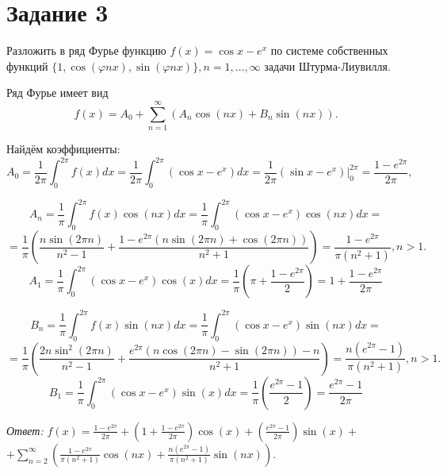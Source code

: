 \section*{Задание 3}
    Разложить в ряд Фурье функцию \( f(x) = \cos x - e^x \) по системе собственных функций \( \{ 1, \cos(\varphi n x), \sin(\varphi n x) \}, n = 1,\dots,\infty \) задачи Штурма-Лиувилля.

    Ряд Фурье имеет вид 
    \[
        f(x) = A_0 + \sum_{n=1}^{\infty} \left( A_n \cos(nx) + B_n \sin(nx) \right).
    \]

    Найдём коэффициенты:
    \[
        A_0 = \frac{1}{2\pi} \int_{0}^{2\pi} f(x) dx = \frac{1}{2\pi} \int_{0}^{2\pi} \left( \cos x - e^x \right) dx = \frac{1}{2\pi} \left( \sin x - e^x \right) \big|_0^{2\pi} = \frac{1 - e^{2\pi}}{2\pi},
    \]

    \[
        A_n = \frac{1}{\pi} \int_{0}^{2\pi} f(x) \cos(nx) dx = \frac{1}{\pi} \int_{0}^{2\pi} \left( \cos x - e^x \right) \cos(nx) dx =
    \]
    \[
        = \frac{1}{\pi} \left( \frac{n \sin(2\pi n)}{n^2 - 1} + \frac{1 - e^{2\pi} \left( n \sin(2\pi n) + \cos(2\pi n)\right)}{n^2+1}\right) = \frac{1 - e^{2\pi}}{\pi (n^2 + 1)}, n > 1.
    \]
    \[
        A_1 = \frac{1}{\pi} \int_{0}^{2\pi} \left( \cos x - e^x \right) \cos(x) dx = \frac{1}{\pi} \left( \pi + \frac{1 - e^{2\pi}}{2} \right)= 1 + \frac{1 - e^{2\pi}}{2\pi}
    \]

    \[
        B_n = \frac{1}{\pi} \int_{0}^{2\pi} f(x) \sin(nx) dx = \frac{1}{\pi} \int_{0}^{2\pi} \left( \cos x - e^x \right) \sin(nx) dx =
    \]
    \[
        = \frac{1}{\pi} \left( \frac{2n \sin^2(2\pi n)}{n^2 - 1} + \frac{e^{2\pi} \left(n \cos(2\pi n) - \sin(2\pi n)\right) - n}{n^2+1}\right) = \frac{n\left(e^{2\pi} - 1\right)}{\pi (n^2 + 1)}, n > 1.
    \]
    \[
        B_1 = \frac{1}{\pi} \int_{0}^{2\pi} \left( \cos x - e^x \right) \sin(x) dx = \frac{1}{\pi} \left( \frac{e^{2\pi} - 1}{2} \right) = \frac{e^{2\pi} - 1}{2\pi}
    \]

    \textit{Ответ:} \( f(x) = \frac{1 - e^{2\pi}}{2\pi} + \left( 1 + \frac{1 - e^{2\pi}}{2\pi} \right)\cos(x) + \left( \frac{e^{2\pi} - 1}{2\pi} \right) \sin(x) + \) \\
    \( + \sum_{n=2}^{\infty} \left( \frac{1 - e^{2\pi}}{\pi (n^2 + 1)} \cos(nx) + \frac{n\left(e^{2\pi} - 1\right)}{\pi (n^2 + 1)} \sin(nx) \right)  \).